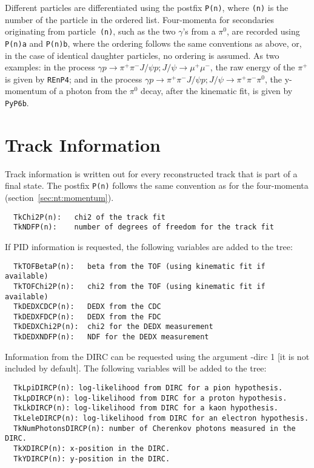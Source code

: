 \documentclass[11pt]{article}
\begin{document}
Different particles are differentiated using the postfix {\tt P(n)}, where {\tt (n)} is the number of the particle in the ordered list.  Four-momenta for secondaries originating from particle~{\tt (n)}, such as the two $\gamma$'s from a $\pi^0$, are recorded using {\tt P(n)a} and {\tt P(n)b}, where the ordering follows the same conventions as above, or, in the case of identical daughter particles, no ordering is assumed.  As two examples: in the process $\gamma p \to\pi^+\pi^-J/\psi p; J/\psi\to\mu^+\mu^-$, the raw energy of the $\pi^+$ is given by {\tt REnP4}; and in the process $\gamma p \to \pi^+\pi^-J/\psi p; J/\psi\to\pi^+\pi^-\pi^0$, the y-momentum of a photon from the $\pi^0$ decay, after the kinematic fit, is given by {\tt PyP6b}.




\section{Track Information}
\label{sec:nt:track}

Track information is written out for every reconstructed track that is part of a final state.  The postfix {\tt P(n)} follows the same convention as for the four-momenta (section~\ref{sec:nt:momentum}).
\begin{verbatim}
  TkChi2P(n):   chi2 of the track fit
  TkNDFP(n):    number of degrees of freedom for the track fit
\end{verbatim}

If PID information is requested, the following variables are added to the tree:
\begin{verbatim}
  TkTOFBetaP(n):   beta from the TOF (using kinematic fit if available)
  TkTOFChi2P(n):   chi2 from the TOF (using kinematic fit if available)
  TkDEDXCDCP(n):   DEDX from the CDC
  TkDEDXFDCP(n):   DEDX from the FDC
  TkDEDXChi2P(n):  chi2 for the DEDX measurement
  TkDEDXNDFP(n):   NDF for the DEDX measurement
\end{verbatim}

Information from the DIRC can be requested using the argument -dirc 1 [it is not included by default]. The following variables will be added to the tree:
\begin{verbatim}
  TkLpiDIRCP(n): log-likelihood from DIRC for a pion hypothesis.
  TkLpDIRCP(n): log-likelihood from DIRC for a proton hypothesis.
  TkLkDIRCP(n): log-likelihood from DIRC for a kaon hypothesis.
  TkLeleDIRCP(n): log-likelihood from DIRC for an electron hypothesis.
  TkNumPhotonsDIRCP(n): number of Cherenkov photons measured in the DIRC.
  TkXDIRCP(n): x-position in the DIRC.
  TkYDIRCP(n): y-position in the DIRC.
\end{verbatim}
\end{document}
